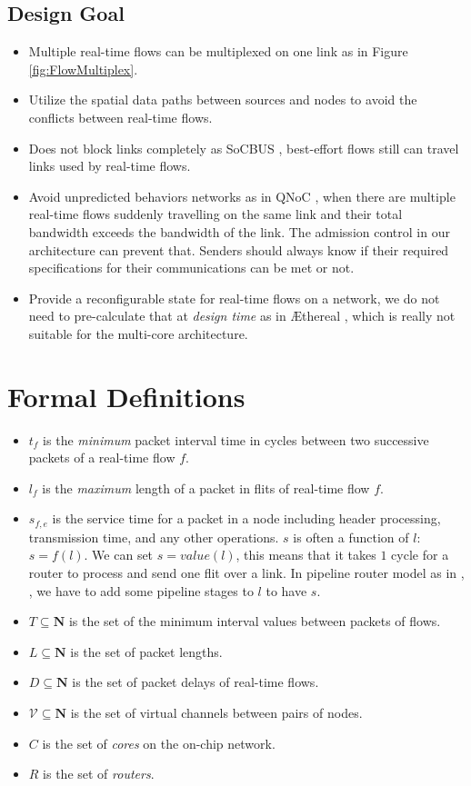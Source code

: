 \documentclass[conference, twocolumn]{IEEEtran}
\theoremstyle{definition}
\begin{document}
\subsection{Design Goal}
\begin{itemize}
\item Multiple real-time flows can be multiplexed on one link
\cite{Ferrari90ascheme} as in Figure \ref{fig:FlowMultiplex}.
\item Utilize the spatial data paths between sources and nodes to avoid the 
conflicts between real-time flows.
\item Does not block links completely as SoCBUS \cite{SoCBUS}, best-effort flows 
still can travel links used by real-time flows.
\item Avoid unpredicted behaviors networks as in QNoC \cite{QNoC}, when there are 
multiple real-time flows suddenly travelling on the same link and their total bandwidth 
exceeds the bandwidth of the link. The admission control in our architecture can 
prevent that. Senders should always know if their required specifications for 
their communications can be met or not. 
\item Provide a reconfigurable state for real-time flows on a network, we do not 
need to pre-calculate that at {\em design time} as in \AE thereal
\cite{Goossens_chapter4}, which is really not suitable for the multi-core architecture.
\end{itemize}
\section{Formal Definitions}
\begin{itemize}
\item $t_f$ is the {\em minimum} packet interval time in cycles between two
successive packets of a real-time flow $f$.
\item $l_f$ is the {\em maximum} length of a packet in flits of real-time flow
$f$.
\item $s_{f,e}$ is the service time for a packet in a node including header 
processing, transmission time, and any other operations. $s$ is often a 
function of $l$: $s=f(l)$. We can set $s=value(l)$, this means that it takes $1$
cycle for a router to process and send one flit over a link. In pipeline router
model as in \cite{PehDelayModel}, \cite{PehSpecPipeR}, we have to add some
pipeline stages to $l$ to have $s$.
\item $T \subseteq \mathbf{N}$ is the set of the minimum interval values between
packets of flows.
\item $L \subseteq \mathbf{N}$ is the set of packet lengths.
\item $D \subseteq \mathbf{N}$ is the set of packet delays of real-time flows.
\item $\mathcal{V} \subseteq \mathbf{N}$ is the set of virtual channels between pairs of nodes.
\item $C$ is the set of {\em cores} on the on-chip network.
\item $R$ is the set of {\em routers}.
\end{itemize}
\end{document}

